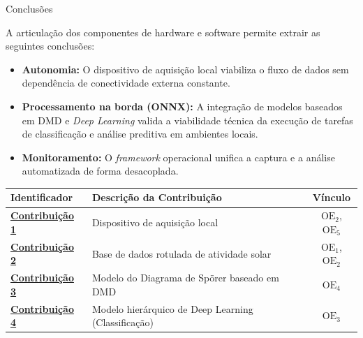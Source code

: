 \documentclass[aspectratio=169]{beamer}
\newcommand{\contrib}[1]{\textcolor{colorRojoContrib}{\textbf{\underline{#1}}}}
\begin{document}
\begin{frame}{Conclusões}
    \small
    
     A articulação dos componentes de hardware e software permite extrair as seguintes conclusões:
    
    \begin{itemize}
        \scriptsize
        \item \textbf{Autonomia:} O dispositivo de aquisição local viabiliza o fluxo de dados sem dependência de conectividade externa constante.
        \item \textbf{Processamento na borda (ONNX):} A integração de modelos baseados em DMD e \textit{Deep Learning} valida a viabilidade técnica da execução de tarefas de classificação e análise preditiva em ambientes locais.
        \item \textbf{Monitoramento:} O \textit{framework} operacional unifica a captura e a análise automatizada de forma desacoplada.
    \end{itemize}

    \centering
    
    \renewcommand{\arraystretch}{1.2} 
    \begin{table}
        \centering
        \scriptsize
        \begin{tabular}{l|l|c}
            \toprule
            \textbf{Identificador} & \textbf{Descrição da Contribuição} & \textbf{Vínculo} \\ 
            \midrule
            \contrib{Contribuição 1} & Dispositivo de aquisição local & $\text{OE}_2$, $\text{OE}_5$ \\ 
            \contrib{Contribuição 2} & Base de dados rotulada de atividade solar & $\text{OE}_1$, $\text{OE}_2$ \\ 
            \contrib{Contribuição 3} & Modelo do Diagrama de Spörer baseado em DMD & $\text{OE}_4$ \\ 
            \contrib{Contribuição 4} & Modelo hierárquico de Deep Learning (Classificação) & $\text{OE}_3$ \\ 
            \bottomrule
        \end{tabular}
    \end{table}
\end{frame}


        
\end{document}
